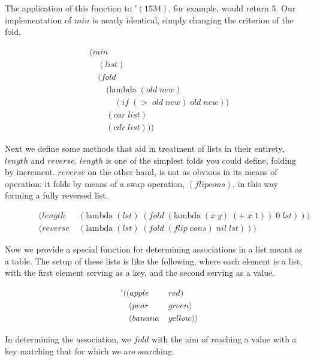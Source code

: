 The application of this function to $'(1 5 3 4)$, for example, would return 5. Our 
implementation of $min$ is nearly identical, simply changing the criterion of the 
fold.

\begin{figure}[ht]
\caption{}\label{scheme}
\begin{align*}
& (min \; 
\\& \quad (list)
\\& \quad (fold \; 
\\& \qquad (\text{lambda} \; (old \; new)
\\& \qquad \quad (if \; (> \; old \; new) \; old \; new))
\\& \qquad (car \; list)
\\& \qquad (cdr \; list)))
\end{align*}
\end{figure}

Next we define some methods that aid in treatment of lists in their entirety, 
$length$ and $reverse$. $length$ is one of the simplest folds you could define, 
folding by increment. $reverse$ on the other hand, is not as obvious in its means 
of operation; it folds by means of a swap operation, $(flip cons)$, in this way 
forming a fully reversed list.

\begin{figure}[ht]
\caption{}\label{scheme}
\begin{align*}
& (length \; &(\text{lambda} \; (lst) \; (fold \; (\text{lambda} \; (x \; y) \; (+ \; x \; 1)) \; 0 \; lst)))
\\& (reverse \; &(\text{lambda} \; (lst) \; (fold \; (flip \; cons) \; nil \; lst)))
\end{align*}
\end{figure}

Now we provide a special function for determining associations in a list meant as 
a table. The setup of these lists is like the following, where each element is a 
list, with the first element serving as a key, and the second serving as a value.

\begin{figure}[ht]
\caption{}\label{scheme}
\begin{align*}
& '((apple \; &red)
\\& \quad (pear \; &green)
\\& \quad (banana \; &yellow))
\end{align*}
\end{figure}

In determining the association, we $fold$ with the aim of reaching a value with a 
key matching that for which we are searching.

